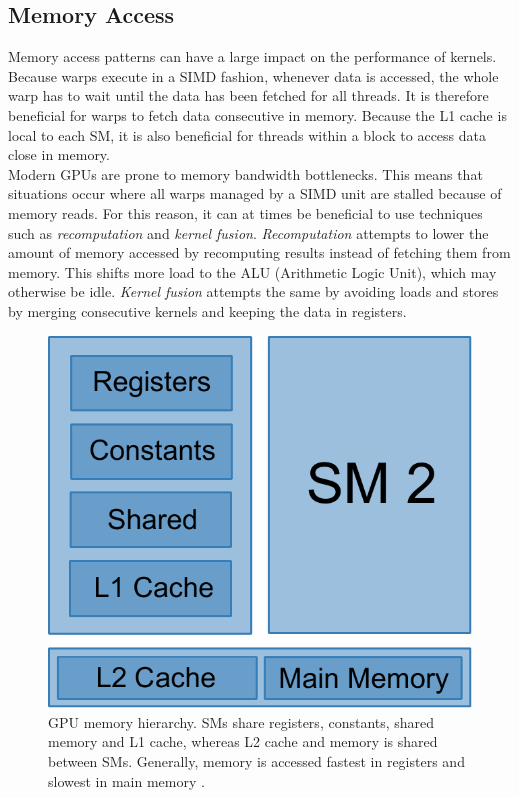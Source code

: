 \subsection{Memory Access}
Memory access patterns can have a large impact on the performance of kernels. Because warps execute in a SIMD fashion, whenever data is accessed, the whole warp has to wait until the data has been fetched for all threads. It is therefore beneficial for warps to fetch data consecutive in memory. Because the L1 cache is local to each SM, it is also beneficial for threads within a block to access data close in memory.\\

Modern GPUs are prone to memory bandwidth bottlenecks. This means that situations occur where all warps managed by a SIMD unit are stalled because of memory reads. For this reason, it can at times be beneficial to use techniques such as \textit{recomputation} and \textit{kernel fusion}. \textit{Recomputation} attempts to lower the amount of memory accessed by recomputing results instead of fetching them from memory. This shifts more load to the ALU (Arithmetic Logic Unit), which may otherwise be idle. \textit{Kernel fusion} attempts the same by avoiding loads and stores by merging consecutive kernels and keeping the data in registers.

\begin{figure}[h]
    \includegraphics[scale=0.5]{figures/gpu_memory.pdf}
    \centering
    \caption{GPU memory hierarchy. SMs share registers, constants, shared memory and L1 cache, whereas L2 cache and memory is shared between SMs. Generally, memory is accessed fastest in registers and slowest in main memory \citep{nvidiaadaarch}.}
    \label{gpu_memory}
\end{figure}


